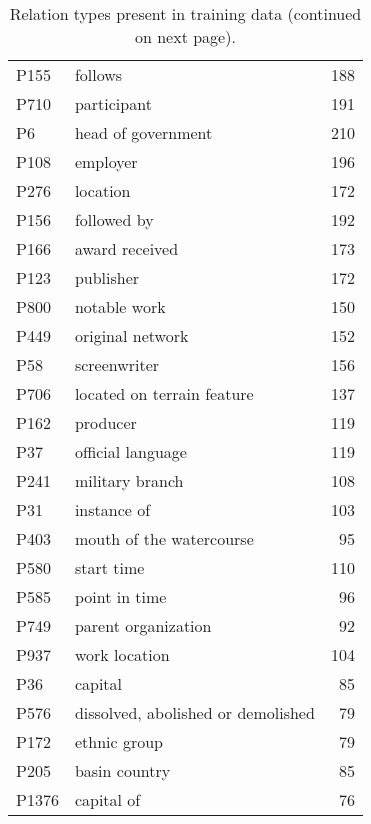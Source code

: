 \documentclass[11pt]{article}
\begin{document}
\begin{table*}
\begin{tabular}{llr}
P155 & follows & 188\\
P710 & participant & 191\\
P6 & head of government & 210\\
P108 & employer & 196\\
P276 & location & 172\\
P156 & followed by & 192\\
P166 & award received & 173\\
P123 & publisher & 172\\
P800 & notable work & 150\\
P449 & original network & 152\\
P58 & screenwriter & 156\\
P706 & located on terrain feature & 137\\
P162 & producer & 119\\
P37 & official language & 119\\
P241 & military branch & 108\\
P31 & instance of & 103\\
P403 & mouth of the watercourse & 95\\
P580 & start time & 110\\
P585 & point in time & 96\\
P749 & parent organization & 92\\
P937 & work location & 104\\
P36 & capital & 85\\
P576 & dissolved, abolished or demolished & 79\\
P172 & ethnic group & 79\\
P205 & basin country & 85\\
P1376 & capital of & 76\\

\hline
\end{tabular}
\caption{\label{tab:train-types1} Relation types present in training data (continued on next page).}
\end{table*}
\end{document}
